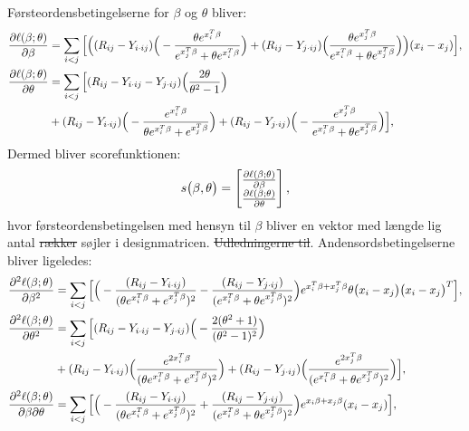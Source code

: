 \documentclass[11pt,a4paper]{article}
\begin{document}
Førsteordensbetingelserne for $\beta$ og $\theta$ bliver:
\begin{align*}
\frac{\partial \ell(\beta;\theta)}{\partial \beta}&= 
\sum_{i<j}\Big{[}\Big{(}
(R_{ij}-Y_{i\cdot ij})\Big{(}-\frac{\theta e^{x_i^T\beta}}{e^{x_j^T\beta}+\theta e^{x_i^T\beta}}\Big{)}+(R_{ij}-Y_{j\cdot ij})\Big{(}\frac{\theta e^{x_j^T\beta}}{e^{x_i^T\beta}+\theta e^{x_j^T\beta}}\Big{)}\Big{)}(x_i-x_j)\Big{]},\\
\frac{\partial \ell(\beta;\theta)}{\partial \theta}&=
\sum_{i<j}
\Big{[}
 (R_{ij}-Y_{i\cdot ij}-Y_{j\cdot ij})\Big{(}\frac{2\theta}{\theta^2-1}\Big{)}\\
 &+(R_{ij}-Y_{i\cdot ij})\Big{(}-\frac{e^{x_i^T\beta}}{\theta e^{x_i^T\beta}+e^{x_j^T\beta}}\Big{)}
 +(R_{ij}-Y_{j\cdot ij})\Big{(}-\frac{e^{x_j^T\beta}}{e^{x_i^T\beta}+\theta e^{x_j^T\beta}}\Big{)}
\Big{]},\\
\end{align*}
Dermed bliver scorefunktionen:
\begin{equation}
s\big{(}\beta,\theta\big{)} = \begin{bmatrix}
\frac{\partial \ell(\beta;\theta)}{\partial \beta}\\
\frac{\partial \ell(\beta;\theta)}{\partial \theta}
\end{bmatrix},
\label{score}
\end{equation}
hvor førsteordensbetingelsen med hensyn til $\beta$ bliver en vektor med længde lig antal \sout{rækker} søjler i designmatricen. 
\sout{Udledningerne til}. Andensordsbetingelserne bliver ligeledes: 
\begin{align}
\frac{\partial^2 \ell(\beta;\theta)}{\partial \beta^2}
&= \sum_{i<j}\Big{[}\Big{(} -\frac{(R_{ij}-Y_{i\cdot ij})}{(\theta e^{x_i^T\beta}+e^{x_j^T\beta})^2}-\frac{(R_{ij}-Y_{j\cdot ij})}{(e^{x_i^T\beta}+\theta e^{x_j^T\beta})^2}\Big{)}e^{x_i^T\beta+x_j^T\beta}\theta\big{(}x_{i}-x_{j}\big{)}\big{(}x_{i}-x_{j}\big{)}^T\Big{]},\label{func:d2db2}\\
\frac{\partial^2 \ell(\beta;\theta)}{\partial \theta^2}
&= \sum_{i<j} 
\Big{[}
(R_{ij}-Y_{i\cdot ij}-Y_{j\cdot ij})\Big{(}-\frac{2(\theta^2+1)}{(\theta^2-1)^2}\Big{)}\\ \nonumber
&+(R_{ij}-Y_{i\cdot ij})\Big{(}\frac{e^{2x_i^T\beta}}{(\theta e^{x_i^T\beta}+e^{x_j^T\beta})^2}\Big{)}
+(R_{ij}-Y_{j\cdot ij})\Big{(}\frac{e^{2x_j^T\beta}}{(e^{x_i^T\beta}+\theta e^{x_j^T\beta})^2}\Big{)}\Big{]},\label{func:d2dt2}\\
\frac{\partial^2 \ell(\beta;\theta)}{\partial \beta\partial \theta}
&= \sum_{i<j}\Big{[}\Big{(}
-\frac{(R_{ij}-Y_{i \cdot ij})}{(\theta e^{x_i^T\beta}+e^{x_j^T\beta})^2}
+\frac{(R_{ij}-Y_{j \cdot ij})}{(e^{x_i^T\beta}+\theta e^{x_j^T\beta})^2}\Big{)}e^{x_i\beta+x_j\beta}(x_{i}-x_{j})\Big{]},\label{func:d2dbt}
\end{align}
\end{document}
